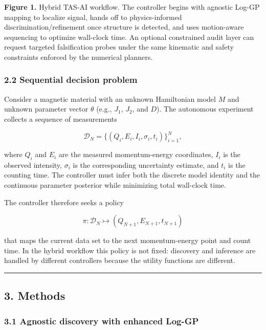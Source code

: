\documentclass[
]{article}
\begin{document}
\textbf{Figure 1.} Hybrid TAS-AI workflow. The controller begins with
agnostic Log-GP mapping to localize signal, hands off to
physics-informed discrimination/refinement once structure is detected,
and uses motion-aware sequencing to optimize wall-clock time. An
optional constrained audit layer can request targeted falsification
probes under the same kinematic and safety constraints enforced by the
numerical planners.

\hypertarget{sequential-decision-problem}{%
\subsubsection{2.2 Sequential decision
problem}\label{sequential-decision-problem}}

Consider a magnetic material with an unknown Hamiltonian model \(M\) and
unknown parameter vector \(\theta\) (e.g., \(J_1\), \(J_2\), and \(D\)).
The autonomous experiment collects a sequence of measurements

\[
\mathcal{D}_N = \{(Q_i,E_i,I_i,\sigma_i,t_i)\}_{i=1}^{N},
\]

where \(Q_i\) and \(E_i\) are the measured momentum-energy coordinates,
\(I_i\) is the observed intensity, \(\sigma_i\) is the corresponding
uncertainty estimate, and \(t_i\) is the counting time. The controller
must infer both the discrete model identity and the continuous parameter
posterior while minimizing total wall-clock time.

The controller therefore seeks a policy

\[
\pi : \mathcal{D}_N \mapsto (Q_{N+1},E_{N+1},t_{N+1})
\]

that maps the current data set to the next momentum-energy point and
count time. In the hybrid workflow this policy is not fixed: discovery
and inference are handled by different controllers because the utility
functions are different.

\begin{center}\rule{0.5\linewidth}{0.5pt}\end{center}

\hypertarget{methods}{%
\subsection{3. Methods}\label{methods}}

\hypertarget{agnostic-discovery-with-enhanced-log-gp}{%
\subsubsection{3.1 Agnostic discovery with enhanced
Log-GP}\label{agnostic-discovery-with-enhanced-log-gp}}
\end{document}
